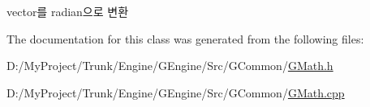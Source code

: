 \begin{DoxyItemize}
\item vector를 radian으로 변환 
\end{DoxyItemize}

The documentation for this class was generated from the following files\+:\begin{DoxyCompactItemize}
\item 
D\+:/\+My\+Project/\+Trunk/\+Engine/\+G\+Engine/\+Src/\+G\+Common/\hyperlink{_g_math_8h}{G\+Math.\+h}\item 
D\+:/\+My\+Project/\+Trunk/\+Engine/\+G\+Engine/\+Src/\+G\+Common/\hyperlink{_g_math_8cpp}{G\+Math.\+cpp}\end{DoxyCompactItemize}
